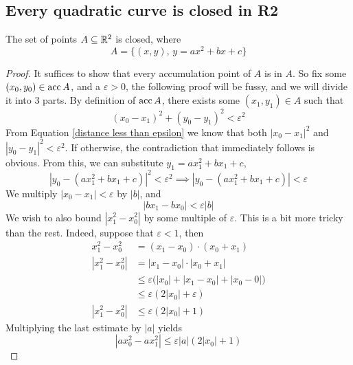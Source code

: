 \documentclass[../../main.tex]{subfiles}
\begin{document}
\subsection{Every quadratic curve is closed in R2}
\begin{wts}
The set of points $A\subseteq\mathbb{R}^2$ is closed, where
\[
A = \{(x,y),\, y=ax^2 + bx + c\}
\]
\end{wts}
\begin{proof}
    It suffices to show that every accumulation point of $A$ is in $A$. So fix some $(x_0,y_0)\in \operatorname{acc}{A}$, and a $\varepsilon>0$, the following proof will be fussy, and we will divide it into 3 parts. By definition of $\operatorname{acc}{A}$, there exists some $(x_1,y_1)\in A$ such that
    \begin{equation}\label{distance less than epsilon}
        (x_0-x_1)^2 + (y_0-y_1)^2<\varepsilon^2
    \end{equation}
    From Equation \eqref{distance less than epsilon} we know that both $|x_0-x_1|^2$ and $|y_0-y_1|^2<\varepsilon^2$. If otherwise, the contradiction that immediately follows is obvious. From this, we can substitute $y_1 = ax^2_1 + bx_1 + c$, 
    \begin{equation}\label{y1 equation}
    \left|y_0 - (ax_1^2 + bx_1 + c)\right|^2<\varepsilon^2\implies \left|y_0 - (ax_1^2 + bx_1 + c)\right|<\varepsilon
    \end{equation}
    We multiply $|x_0 - x_1|<\varepsilon$ by $|b|$, and
    \begin{equation}\label{x1 b equation}
    |bx_1-bx_0|<\varepsilon|b|
    \end{equation}
    We wish to also bound $|x_1^2-x_0^2|$ by some multiple of $\varepsilon$. This is a bit more tricky than the rest. Indeed, suppose that $\varepsilon<1$, then
    \begin{align*}
        x_1^2 - x_0^2&=(x_1-x_0)\cdot(x_0+x_1)\\[1ex]
        |x_1^2 - x_0^2|&=|x_1-x_0|\cdot|x_0+x_1|\\[1ex]
        &\leq \varepsilon\biggl(|x_0| + |x_1-x_0|+|x_0-0|\biggr)\\[1ex]
        &\leq \varepsilon(2|x_0|+\varepsilon)\\[1ex]
        |x_1^2-x_0^2|&\leq \varepsilon(2|x_0|+1)
    \end{align*}
    Multiplying the last estimate by $|a|$ yields
    \begin{equation}\label{x1 a equation}
    |ax_0^2 - ax_1^2|\leq \varepsilon |a|(2|x_0|+1)
    \end{equation}

\end{proof}
\end{document}
